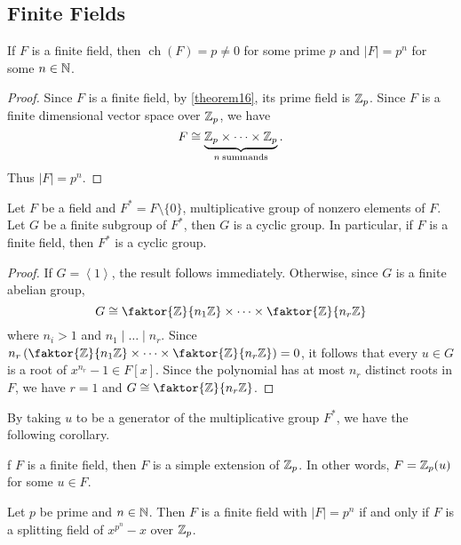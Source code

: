 \documentclass[11pt]{article}
\newcommand{\cyclic}[1]{\left\langle #1 \right\rangle}
\newcommand{\quotient}[2]{\faktor{#1}{#2}}
\DeclareMathOperator{\ch}{ch}
\begin{document}
\subsection{Finite Fields}
\begin{prop}
If $F$ is a finite field, then $\ch(F) = p \neq 0$ for some prime $p$ and $|F| =
p^n$ for some $n \in \mathbb{N}$. 
\end{prop}
\begin{proof}
Since $F$ is a finite field, by \cref{theorem16}, its prime field is $\mathbb{Z}_p$.
Since $F$ is a finite dimensional vector space over $\mathbb{Z}_p$, we have
\begin{equation*}
F \cong \underbrace{\mathbb{Z}_p \times \dots \times \mathbb{Z}_p}_{n\>\text{summands}}.
\end{equation*}
Thus $|F| = p^n$.
\end{proof}
\begin{theorem}
Let $F$ be a field and $F^* = F\setminus\{0\}$, multiplicative group of nonzero
elements of $F$. Let $G$ be a finite subgroup of $F^*$, then $G$ is a cyclic
group. In particular, if $F$ is a finite field, then $F^*$ is a cyclic group.
\label{theorem21}
\end{theorem}
\begin{proof}
If $G = \cyclic{1}$, the result follows immediately. Otherwise, since $G$ is a
finite abelian group,
\begin{equation*}
G \cong \quotient{\Z}{n_1\Z} \times \dots \times \quotient{\Z}{n_r\Z}
\end{equation*}
where $n_i > 1$ and $n_1 \mid \dots \mid n_r$. Since
$n_r\left(\quotient{\Z}{n_1\Z} \times \dots \times \quotient{\Z}{n_r\Z}\right) =
0$, it follows that every $u \in G$ is a root of $x^{n_r} - 1 \in F[x]$. Since
the polynomial has at most $n_r$ distinct roots in $F$, we have $r = 1$ and
$G \cong \quotient{\Z}{n_r\Z}$.
\end{proof}
By taking $u$ to be a generator of the multiplicative group $F^*$, we have the
following corollary.
\begin{corollary}
f $F$ is a finite field, then $F$ is a simple extension of $\mathbb{Z}_p$. In other
words, $F = \mathbb{Z}_p(u)$ for some $u \in F$.
\end{corollary}
\begin{prop} \label{prop24}
Let $p$ be prime and $n \in \mathbb{N}$. Then $F$ is a finite field with $|F| = p^n$ if
and only if $F$ is a splitting field of $x^{p^n} - x$ over $\mathbb{Z}_p$.
\end{prop}
\end{document}
